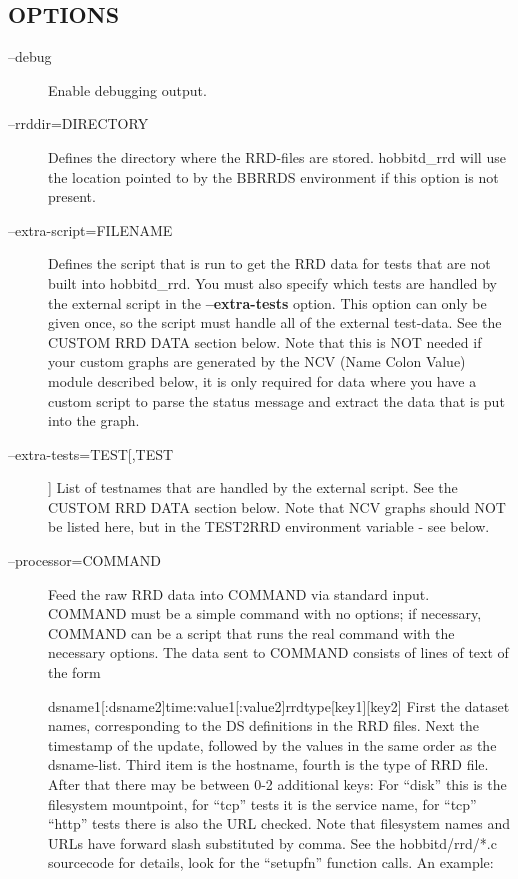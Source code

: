  
\subsection{OPTIONS}
\begin{description}
\item[--debug] Enable debugging output. 

 

\item[--rrddir=DIRECTORY] Defines the directory where the RRD-files are stored. hobbitd\_rrd will use the location pointed to by the BBRRDS environment if this option is not present. 

 

\item[--extra-script=FILENAME] Defines the script that is run to get the RRD data for tests that are not built into hobbitd\_rrd. You must also specify which tests are handled by the external script in the \textbf{--extra-tests}
 option. This option can only be given once, so the script must handle all of the external test-data. See the CUSTOM RRD DATA section below. Note that this is NOT needed if your custom graphs are generated by the NCV (Name Colon Value) module described below, it is only required for data where you have a custom script to parse the status message and extract the data that is put into the graph. 

 

\item[--extra-tests=TEST[,TEST]] List of testnames that are handled by the external script. See the CUSTOM RRD DATA section below. Note that NCV graphs should NOT be listed here, but in the TEST2RRD environment variable - see below. 

 

\item[--processor=COMMAND] Feed the raw RRD data into COMMAND via standard input. COMMAND must be a simple command with no options; if necessary, COMMAND can be a script that runs the real command with the necessary options. The data sent to COMMAND consists of lines of text of the form  
 
dsname1[:dsname2]time:value1[:value2]rrdtype[key1][key2]  
 First the dataset names, corresponding to the DS definitions in the RRD files. Next the timestamp of the update, followed by the values in the same order as the dsname-list. Third item is the hostname, fourth is the type of RRD file. After that there may be between 0-2 additional keys: For ``disk'' this is the filesystem mountpoint, for ``tcp'' tests it is the service name, for ``tcp'' ``http'' tests there is also the URL checked. Note that filesystem names and URLs have forward slash substituted by comma. See the hobbitd/rrd/*.c sourcecode for details, look for the ``setupfn'' function calls. An example:  



\end{description}
